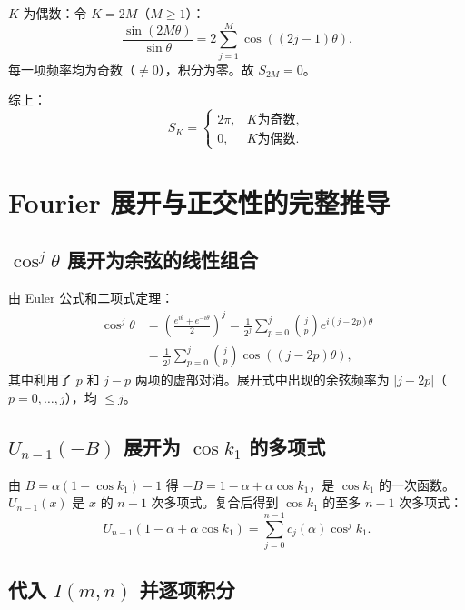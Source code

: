 \documentclass{article} %
\begin{document}
$K$ 为偶数：令 $K=2M$（$M\ge 1$）：
\begin{equation}
    \frac{\sin(2M\theta)}{\sin\theta} = 2\sum_{j=1}^{M}\cos((2j-1)\theta).
\end{equation}
每一项频率均为奇数（$\neq 0$），积分为零。故 $S_{2M} = 0$。

综上：
\begin{equation}
    \boxed{
    S_K =
    \begin{cases}
        2\pi, & K \text{为奇数},\\
        0, & K \text{为偶数}.
    \end{cases}
    }
    \label{eq:C1}
\end{equation}

\section{Fourier 展开与正交性的完整推导}

\subsection{$\cos^j\theta$ 展开为余弦的线性组合}

由 Euler 公式和二项式定理：
\begin{align}
    \cos^j\theta &= \left(\frac{e^{i\theta}+e^{-i\theta}}{2}\right)^j
    = \frac{1}{2^j}\sum_{p=0}^j \binom{j}{p} e^{i(j-2p)\theta} \nonumber\\
    &= \frac{1}{2^j}\sum_{p=0}^j \binom{j}{p} \cos((j-2p)\theta),
    \label{eq:D1}
\end{align}
其中利用了 $p$ 和 $j-p$ 两项的虚部对消。展开式中出现的余弦频率为 $|j-2p|$（$p=0,\dots,j$），均 $\le j$。

\subsection{$U_{n-1}(-B)$ 展开为 $\cos k_1$ 的多项式}

由 $B = \alpha(1-\cos k_1) - 1$ 得 $-B = 1-\alpha+\alpha\cos k_1$，是 $\cos k_1$ 的一次函数。$U_{n-1}(x)$ 是 $x$ 的 $n-1$ 次多项式。复合后得到 $\cos k_1$ 的至多 $n-1$ 次多项式：
\begin{equation}
    U_{n-1}(1-\alpha+\alpha\cos k_1) = \sum_{j=0}^{n-1} c_j(\alpha)\cos^j k_1.
    \label{eq:D2}
\end{equation}

\subsection{代入 $I(m,n)$ 并逐项积分}
\end{document}
